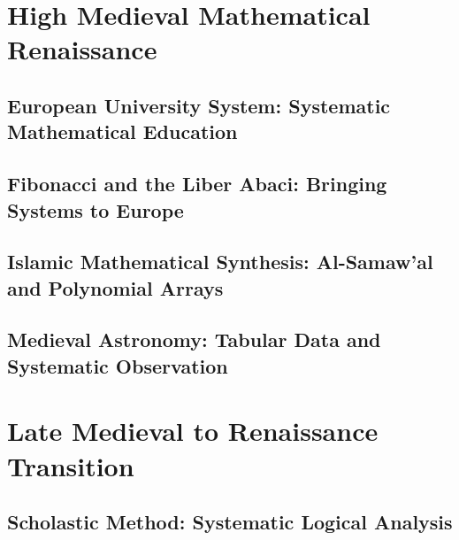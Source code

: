 \documentclass[12pt, oneside, openany]{book}
\begin{document}

\chapter{High Medieval Mathematical Renaissance}

\section{European University System: Systematic Mathematical Education}

\section{Fibonacci and the Liber Abaci: Bringing Systems to Europe}

\section{Islamic Mathematical Synthesis: Al-Samaw'al and Polynomial Arrays}

\section{Medieval Astronomy: Tabular Data and Systematic Observation}


\chapter{Late Medieval to Renaissance Transition}

\section{Scholastic Method: Systematic Logical Analysis}
\end{document}
